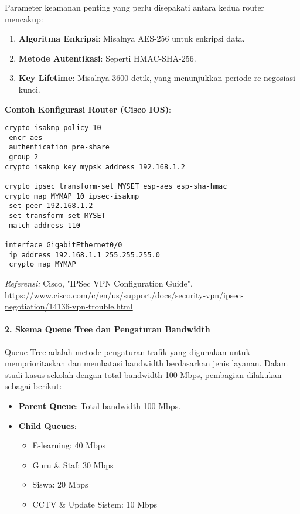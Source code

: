 Parameter keamanan penting yang perlu disepakati antara kedua router mencakup:
\begin{enumerate}
  \item \textbf{Algoritma Enkripsi}: Misalnya AES-256 untuk enkripsi data.
  \item \textbf{Metode Autentikasi}: Seperti HMAC-SHA-256.
  \item \textbf{Key Lifetime}: Misalnya 3600 detik, yang menunjukkan periode re-negosiasi kunci.
\end{enumerate}

\textbf{Contoh Konfigurasi Router (Cisco IOS)}:
\begin{verbatim}
crypto isakmp policy 10
 encr aes
 authentication pre-share
 group 2
crypto isakmp key mypsk address 192.168.1.2

crypto ipsec transform-set MYSET esp-aes esp-sha-hmac
crypto map MYMAP 10 ipsec-isakmp 
 set peer 192.168.1.2
 set transform-set MYSET
 match address 110

interface GigabitEthernet0/0
 ip address 192.168.1.1 255.255.255.0
 crypto map MYMAP
\end{verbatim}

\textit{Referensi:} 
Cisco, "IPSec VPN Configuration Guide", \url{https://www.cisco.com/c/en/us/support/docs/security-vpn/ipsec-negotiation/14136-vpn-trouble.html}

\paragraph{2. Skema Queue Tree dan Pengaturan Bandwidth}

Queue Tree adalah metode pengaturan trafik yang digunakan untuk memprioritaskan dan membatasi bandwidth berdasarkan jenis layanan. Dalam studi kasus sekolah dengan total bandwidth 100 Mbps, pembagian dilakukan sebagai berikut:

\begin{itemize}
  \item \textbf{Parent Queue}: Total bandwidth 100 Mbps.
  \item \textbf{Child Queues}:
  \begin{itemize}
    \item E-learning: 40 Mbps
    \item Guru \& Staf: 30 Mbps
    \item Siswa: 20 Mbps
    \item CCTV \& Update Sistem: 10 Mbps
  \end{itemize}
\end{itemize}

